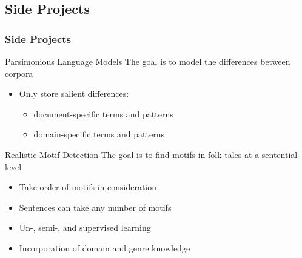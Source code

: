 \documentclass{beamer}
\begin{document}
\begin{frame}\section{Side Projects}
    \frametitle{Side Projects}

    \begin{block}{Parsimonious Language Models}
        The goal is to model the differences between corpora
        \begin{itemize}
            \item Only store salient differences:
                \begin{itemize}
                    \item document-specific terms and patterns
                    \item domain-specific terms and patterns
                \end{itemize}
        \end{itemize}
    \end{block}

    \begin{block}{Realistic Motif Detection}
        The goal is to find motifs in folk tales at a sentential level
        \begin{itemize}
            \item Take order of motifs in consideration
            \item Sentences can take any number of motifs
            \item Un-, semi-, and supervised learning
            \item Incorporation of domain and genre knowledge
        \end{itemize}
    \end{block}
\end{frame}
\end{document}
